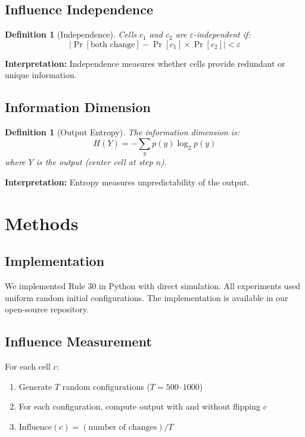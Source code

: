\documentclass[11pt]{article}
\newtheorem{definition}[theorem]{Definition}
\begin{document}
\subsection{Influence Independence}

\begin{definition}[Independence]
Cells $c_1$ and $c_2$ are $\varepsilon$-independent if:
\begin{equation}
|\Pr[\text{both change}] - \Pr[c_1] \times \Pr[c_2]| < \varepsilon
\end{equation}
\end{definition}

\textbf{Interpretation:} Independence measures whether cells provide redundant or unique information.

\subsection{Information Dimension}

\begin{definition}[Output Entropy]
The information dimension is:
\begin{equation}
H(Y) = -\sum_y p(y) \log_2 p(y)
\end{equation}
where $Y$ is the output (center cell at step $n$).
\end{definition}

\textbf{Interpretation:} Entropy measures unpredictability of the output.

\section{Methods}

\subsection{Implementation}

We implemented Rule 30 in Python with direct simulation. All experiments used uniform random initial configurations. The implementation is available in our open-source repository.

\subsection{Influence Measurement}

For each cell $c$:
\begin{enumerate}
    \item Generate $T$ random configurations ($T = 500$--$1000$)
    \item For each configuration, compute output with and without flipping $c$
    \item $\text{Influence}(c) = (\text{number of changes}) / T$
\end{enumerate}
\end{document}
